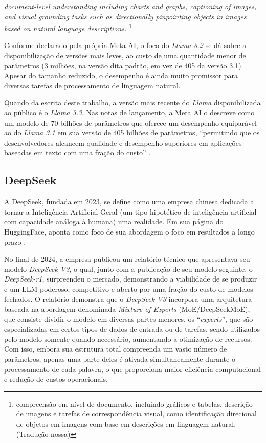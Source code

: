 \begin{citacao}
    \textit{document-level understanding including charts and graphs, captioning of images, and visual grounding tasks such as directionally pinpointing objects in images based on natural language descriptions.} \cite{Llama:6} \footnote{compreensão em nível de documento, incluindo gráficos e tabelas, descrição de imagens e tarefas de correspondência visual, como identificação direcional de objetos em imagens com base em descrições em linguagem natural. (Tradução nossa)}
\end{citacao}

Conforme declarado pela própria Meta AI, o foco do \textit{Llama 3.2} se dá sobre a disponibilização de versões mais leves, ao custo de uma quantidade menor de parâmetros (3 milhões, na versão dita padrão, em vez de 405 da versão 3.1). Apesar do tamanho reduzido, o desempenho é ainda muito promissor para diversas tarefas de processamento de linguagem natural.

Quando da escrita deste trabalho, a versão mais recente do \textit{Llama} disponibilizada ao público é o \textit{Llama 3.3}. Nas notas de lançamento, a Meta AI o descreve como um modelo de 70 bilhões de parâmetros que oferece um desempenho equiparável ao do \textit{Llama 3.1} em sua versão de 405 bilhões de parâmetros, ``permitindo que os desenvolvedores alcancem qualidade e desempenho superiores em aplicações baseadas em texto com uma fração do custo'' \cite{Llama:7, Llama:8}.

\subsection{DeepSeek}
\label{subsec:Assistente.2.2}
A DeepSeek, fundada em 2023, se define como uma empresa chinesa dedicada a tornar a Inteligência Artificial Geral (um tipo hipotético de inteligência artificial com capacidade análoga à humana) uma realidade. Em sua página do HuggingFace, aponta como foco de sua abordagem o foco em resultados a longo prazo \cite{DeepSeek:1}.

No final de 2024, a empresa publicou um relatório técnico que apresentava seu modelo \textit{DeepSeek-V3}, o qual, junto com a publicação de seu modelo seguinte, o \textit{DeepSeek-r1}, surpreendeu o mercado, demonstrando a viabilidade de se produzir e um \ac{LLM} poderoso, competitivo e aberto por uma fração do custo de modelos fechados. O relatório demonstra que o \textit{DeepSeek-V3} incorpora uma arquitetura baseada na abordagem denominada \textit{Mixture-of-Experts} (MoE/DeepSeekMoE), que consiste dividir o modelo em diversas partes menores, os ``\textit{experts}'', que são especializadas em certos tipos de dados de entrada ou de tarefas, sendo utilizados pelo modelo somente quando necessário, aumentando a otimização de recursos. Com isso, embora sua estrutura total compreenda um vasto número de parâmetros, apenas uma parte deles é ativada simultaneamente durante o processamento de cada palavra, o que proporciona maior eficiência computacional e redução de custos operacionais.

